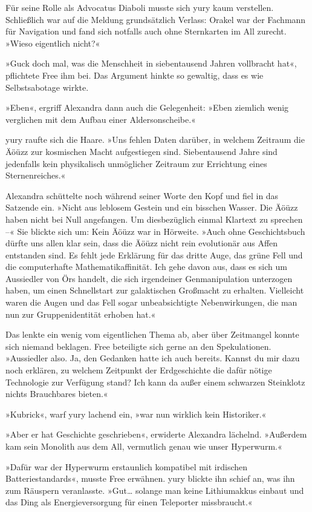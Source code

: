 Für seine Rolle als Advocatus Diaboli musste sich yury kaum verstellen. Schließlich war auf die Meldung grundsätzlich Verlass: Orakel war der Fachmann für Navigation und fand sich notfalls auch ohne Sternkarten im All zurecht. »Wieso eigentlich nicht?«

»Guck doch mal, was die Menschheit in siebentausend Jahren vollbracht hat«, pflichtete Free ihm bei. Das Argument hinkte so gewaltig, dass es wie Selbstsabotage wirkte.

»Eben«, ergriff Alexandra dann auch die Gelegenheit: »Eben ziemlich wenig verglichen mit dem Aufbau einer Aldersonscheibe.«

yury raufte sich die Haare. »Uns fehlen Daten darüber, in welchem Zeitraum die Äöüzz zur kosmischen Macht aufgestiegen sind. Siebentausend Jahre sind jedenfalls kein physikalisch unmöglicher Zeitraum zur Errichtung eines Sternenreiches.«

Alexandra schüttelte noch während seiner Worte den Kopf und fiel in das Satzende ein. »Nicht aus leblosem Gestein und ein bisschen Wasser. Die Äöüzz haben nicht bei Null angefangen. Um diesbezüglich einmal Klartext zu sprechen –« Sie blickte sich um: Kein Äöüzz war in Hörweite. »Auch ohne Geschichtsbuch dürfte uns allen klar sein, dass die Äöüzz nicht rein evolutionär aus Affen entstanden sind. Es fehlt jede Erklärung für das dritte Auge, das grüne Fell und die computerhafte Mathematikaffinität. Ich gehe davon aus, dass es sich um Aussiedler von Örs handelt, die sich irgendeiner Genmanipulation unterzogen haben, um einen Schnellstart zur galaktischen Großmacht zu erhalten. Vielleicht waren die Augen und das Fell sogar unbeabsichtigte Nebenwirkungen, die man nun zur Gruppenidentität erhoben hat.«

Das lenkte ein wenig vom eigentlichen Thema ab, aber über Zeitmangel konnte sich niemand beklagen. Free beteiligte sich gerne an den Spekulationen. »Aussiedler also. Ja, den Gedanken hatte ich auch bereits. Kannst du mir dazu noch erklären, zu welchem Zeitpunkt der Erdgeschichte die dafür nötige Technologie zur Verfügung stand? Ich kann da außer einem schwarzen Steinklotz nichts Brauchbares bieten.«

»Kubrick«, warf yury lachend ein, »war nun wirklich kein Historiker.«

»Aber er hat Geschichte geschrieben«, erwiderte Alexandra lächelnd. »Außerdem kam sein Monolith aus dem All, vermutlich genau wie unser Hyperwurm.«

»Dafür war der Hyperwurm erstaunlich kompatibel mit irdischen Batteriestandards«, musste Free erwähnen. yury blickte ihn schief an, was ihn zum Räuspern veranlasste. »Gut… solange man keine Lithiumakkus einbaut und das Ding als Energieversorgung für einen Teleporter missbraucht.«

